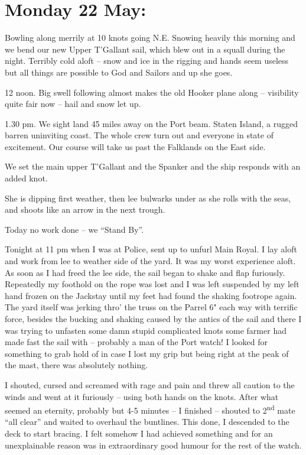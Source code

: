 \documentclass[
  11pt,
  msmallroyalvopaper
]{memoir}
\begin{document}
\hypertarget{monday-22-may}{%
\section{Monday 22 May:}\label{monday-22-may}}

Bowling along merrily at 10 knots going N.E. Snowing heavily this
morning and we bend our new Upper T'Gallant sail, which blew out in a
squall during the night. Terribly cold aloft -- snow and ice in the
rigging and hands seem useless but all things are possible to God and
Sailors and up she goes.

12 noon. Big swell following almost makes the old Hooker plane along --
visibility quite fair now -- hail and snow let up.

1.30 pm. We sight land 45 miles away on the Port beam. Staten Island, a
rugged barren uninviting coast. The whole crew turn out and everyone in
state of excitement. Our course will take us past the Falklands on the
East side.

We set the main upper T'Gallant and the Spanker and the ship responds
with an added knot.

She is dipping first weather, then lee bulwarks under as she rolls with
the seas, and shoots like an arrow in the next trough.

Today no work done -- we ``Stand By''.

Tonight at 11 pm when I was at Police, sent up to unfurl Main Royal. I
lay aloft and work from lee to weather side of the yard. It was my worst
experience aloft. As soon as I had freed the lee side, the sail began to
shake and flap furiously. Repeatedly my foothold on the rope was lost
and I was left suspended by my left hand frozen on the Jackstay until my
feet had found the shaking footrope again. The yard itself was jerking
thro' the truss on the Parrel 6" each way with terrific force, besides
the bucking and shaking caused by the antics of the sail and there I was
trying to unfasten some damn stupid complicated knots some farmer had
made fast the sail with -- probably a man of the Port watch! I looked
for something to grab hold of in case I lost my grip but being right at
the peak of the mast, there was absolutely nothing.

I shouted, cursed and screamed with rage and pain and threw all caution
to the winds and went at it furiously -- using both hands on the knots.
After what seemed an eternity, probably but 4-5 minutes -- I finished --
shouted to 2\textsuperscript{nd} mate ``all clear'' and waited to
overhaul the buntlines. This done, I descended to the deck to start
bracing. I felt somehow I had achieved something and for an
unexplainable reason was in extraordinary good humour for the rest of
the watch.
\end{document}

